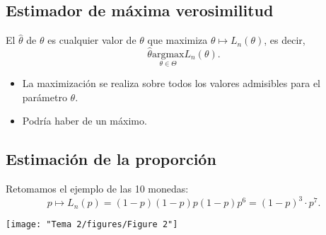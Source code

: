 \subsection{Estimador de máxima verosimilitud}
\begin{tcolorbox}[colback=blue!5!white, colframe=blue!75!black, title=\textbf{Definición}]
El  $\hat{\theta}$  de $\theta$ es cualquier valor de $\theta$ que maximiza $\theta\longmapsto L_n(\theta)$, es decir, \[
    \hat{\theta}\underset{\theta \in \Theta}{\mathrm{argmax}}L_n(\theta).
\] 
\end{tcolorbox}
\begin{tcolorbox}[colback=red!5!white, colframe=red!75!black, title=\textbf{Nota}]
\begin{itemize}[label=\textbullet]
    \item La maximización se realiza sobre todos los valores admisibles para el parámetro $\theta$.
    \item Podría haber de un máximo.
\end{itemize}
\end{tcolorbox}
\subsection*{Estimación de la proporción}
Retomamos el ejemplo de las 10 monedas: \[
p\longmapsto L_n(p)=(1-p)(1-p)p(1-p)p^6=(1-p)^3\cdot p^7.
\] 
\begin{center}
    \texttt{[image: "Tema 2/figures/Figure 2"]}
\end{center}
